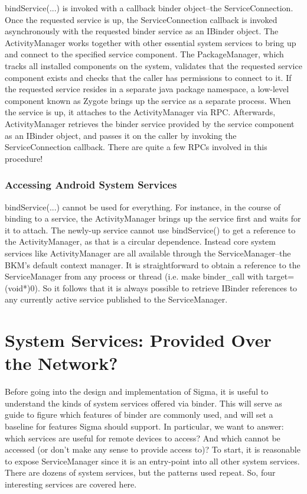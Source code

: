 \documentclass[prodmode]{acmlarge}
\begin{document}
bindService(...) is invoked with a callback binder object--the ServiceConnection. Once the requested service is up, the ServiceConnection callback is invoked asynchronously with the requested binder service as an IBinder object. The ActivityManager works together with other essential system services to bring up and connect to the specified service component. The PackageManager, which tracks all installed components on the system, validates that the requested service component exists and checks that the caller has permissions to connect to it. If the requested service resides in a separate java package namespace, a low-level component known as Zygote brings up the service as a separate process. When the service is up, it attaches to the ActivityManager via RPC. Afterwards, ActivityManager retrieves the binder service provided by the service component as an IBinder object, and passes it on the caller by invoking the ServiceConnection callback. There are quite a few RPCs involved in this procedure!

\subsubsection{Accessing Android System Services}
bindService(...) cannot be used for everything. For instance, in the course of binding to a service, the ActivityManager brings up the service first and waits for it to attach. The newly-up service cannot use bindService() to get a reference to the ActivityManager, as that is a circular dependence. Instead core system services like ActivityManager are all available through the ServiceManager--the BKM's default context manager. It is straightforward to obtain a reference to the ServiceManager from any process or thread (i.e. make binder\_call with target=(void*)0). So it follows that it is always possible to retrieve IBinder references to any currently active service published to the ServiceManager.

\section{System Services: Provided Over the Network?}
\label{sec:SystemServices}
Before going into the design and implementation of Sigma, it is useful to understand the kinds of system services offered via binder. This will serve as guide to figure which features of binder are commonly used, and will set a baseline for features Sigma should support. In particular, we want to answer: which services are useful for remote devices to access? And which cannot be accessed (or don't make any sense to provide access to)?  To start, it is reasonable to expose ServiceManager since it is an entry-point into all other system services. There are dozens of system services, but the patterns used repeat. So, four interesting services are covered here.
\end{document}
